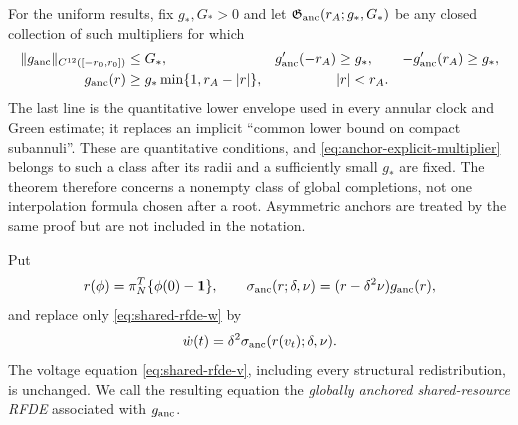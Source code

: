 For the uniform results, fix \(g_*,G_*>0\) and let
\(\mathfrak G_{\rm anc}(r_A;g_*,G_*)\) be any closed collection of such
multipliers for which
\begin{equation}
\begin{aligned}
 \|g_{\rm anc}\|_{C^{12}([-r_0,r_0])}&\le G_*,
 &g_{\rm anc}'(-r_A)&\ge g_*,
 &-g_{\rm anc}'(r_A)&\ge g_* ,\\
 g_{\rm anc}(r)&\ge
 g_*\min\{1,r_A-|r|\},&& |r|<r_A .
\end{aligned}                                      \label{eq:anchor-admissible-class}
\end{equation}
The last line is the quantitative lower envelope used in every annular
clock and Green estimate; it replaces an implicit ``common lower bound on
compact subannuli''.  These are quantitative conditions, and
\cref{eq:anchor-explicit-multiplier} belongs to such a class after its radii
and a sufficiently small \(g_*\) are fixed.  The theorem therefore concerns a
nonempty class of global completions, not one interpolation formula chosen
after a root.  Asymmetric anchors are treated by the same proof but are not
included in the notation.

Put
\begin{equation}
 r(\phi)=\pi_N^T\{\phi(0)-\mathbf1\},\qquad
 \sigma_{\rm anc}(r;\delta,\nu)
  =(r-\delta^2\nu)g_{\rm anc}(r),                   \label{eq:anchor-source}
\end{equation}
and replace only \cref{eq:shared-rfde-w} by
\begin{equation}
 \dot w(t)=\delta^2\sigma_{\rm anc}(r(v_t);\delta,\nu).
                                                               \label{eq:anchored-recovery-law}
\end{equation}
The voltage equation \cref{eq:shared-rfde-v}, including every structural
redistribution, is unchanged.  We call the resulting equation the
\emph{globally anchored shared-resource RFDE} associated with
\(g_{\rm anc}\).



